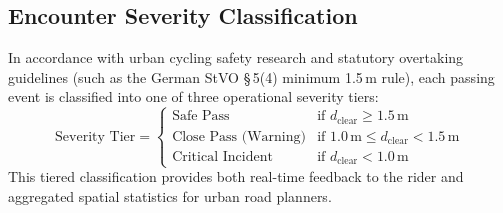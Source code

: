\subsection{Encounter Severity Classification}
In accordance with urban cycling safety research and statutory overtaking guidelines (such as the German StVO \S\,5(4) minimum 1.5\,m rule), each passing event is classified into one of three operational severity tiers:
\begin{equation}
    \text{Severity Tier} = \begin{cases}
        \text{Safe Pass} & \text{if } d_{\text{clear}} \ge 1.5\,\text{m} \\
        \text{Close Pass (Warning)} & \text{if } 1.0\,\text{m} \le d_{\text{clear}} < 1.5\,\text{m} \\
        \text{Critical Incident} & \text{if } d_{\text{clear}} < 1.0\,\text{m}
    \end{cases}
\end{equation}
This tiered classification provides both real-time feedback to the rider and aggregated spatial statistics for urban road planners.
